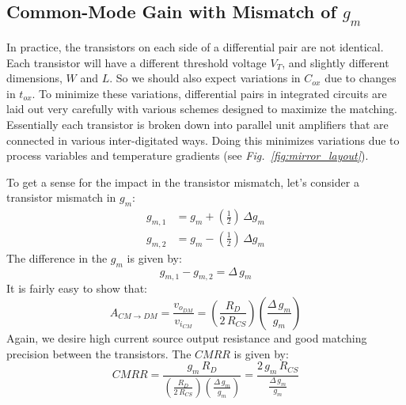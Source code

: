 \subsection{Common-Mode Gain with Mismatch of \texorpdfstring{$g_m$}{Transconductance}}
In practice, the transistors on each side of a differential pair are not identical.  Each transistor will have a different threshold voltage $V_T$, and slightly different dimensions, $W$ and $L$.  So we should also expect variations in $C_{ox}$ due to changes in $t_{ox}$.  To minimize these variations, differential pairs in integrated circuits are laid out very carefully with various schemes designed to maximize the matching.  Essentially each transistor is broken down into parallel unit amplifiers that are connected in various inter-digitated ways.  Doing this minimizes variations due to process variables and temperature gradients (see \emph{Fig.~\ref{fig:mirror_layout}}).

To get a sense for the impact in the transistor mismatch, let's consider a transistor mismatch in $g_m$:
    \begin{align} 
        g_{m,1} &= g_m + \left(\frac{1}{2}\right)\,\Delta g_m\\[0.15cm]
        g_{m,2} &= g_m - \left(\frac{1}{2}\right)\,\Delta g_m
    \end{align}
The difference in the $g_m$ is given by:
    \begin{equation}
        g_{m,1} - g_{m,2} = \Delta\,g_m
    \end{equation}
It is fairly easy to show that:
    \begin{equation}
        A_{CM \to DM} = \frac{v_{o_{DM}}}{v_{i_{CM}}}
        = \left(\frac{R_D}{2\,R_{CS}}\right) \left(\frac{\Delta\,g_m}{g_m}\right)
    \end{equation}
Again, we desire high current source output resistance and good matching precision between the transistors.  The $CMRR$ is given by:
    \begin{equation}
        CMRR = \frac{g_m\,R_D}{\left(\frac{R_D}{2\,R_{CS}}\right) \left(\frac{\Delta\,g_m}{g_m}\right)}
        = \frac{2\,g_m\,R_{CS}}{\frac{\Delta\,g_m}{g_m}}
    \end{equation}
